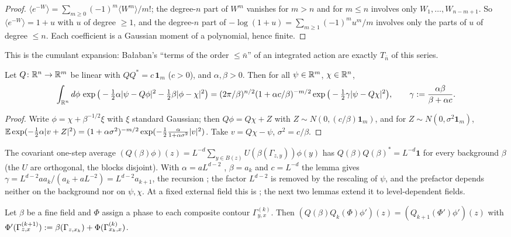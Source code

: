 \begin{proof}
$\langle e^{-W}\rangle=\sum_{m\ge0}(-1)^m\langle W^m\rangle/m!$; the degree-$n$ part of $W^m$ vanishes for $m>n$ and for $m\le n$ involves only $W_1,\dots,W_{n-m+1}$. So $\langle e^{-W}\rangle=1+u$ with $u$ of degree $\ge1$, and the degree-$n$ part of $-\log(1+u)=\sum_{m\ge1}(-1)^mu^m/m$ involves only the parts of $u$ of degree $\le n$. Each coefficient is a Gaussian moment of a polynomial, hence finite.
\end{proof}

This is the cumulant expansion: Ba{\l}aban's ``terms of the order $\le\bar n$'' of an integrated action are exactly $T_{\bar n}$ of this series.

\begin{lemma}\label{lem:a06d:B3}
Let $Q\colon\mathbb R^n\to\mathbb R^m$ be linear with $QQ^*=c\,\mathbf 1_m$ ($c>0$), and $\alpha,\beta>0$. Then for all $\psi\in\mathbb R^m$, $\chi\in\mathbb R^n$,
\[
\int_{\mathbb R^n}d\phi\,\exp\big(-\tfrac12\alpha|\psi-Q\phi|^2-\tfrac12\beta|\phi-\chi|^2\big)=(2\pi/\beta)^{n/2}(1+\alpha c/\beta)^{-m/2}\exp\big(-\tfrac12\gamma|\psi-Q\chi|^2\big),\qquad\gamma:=\frac{\alpha\beta}{\beta+\alpha c}.
\]
\end{lemma}

\begin{proof}
Write $\phi=\chi+\beta^{-1/2}\xi$ with $\xi$ standard Gaussian; then $Q\phi=Q\chi+Z$ with $Z\sim N(0,(c/\beta)\mathbf 1_m)$, and for $Z\sim N(0,\sigma^2\mathbf 1_m)$, $\mathbb E\exp(-\frac12\alpha|v+Z|^2)=(1+\alpha\sigma^2)^{-m/2}\exp(-\frac12\frac{\alpha}{1+\alpha\sigma^2}|v|^2)$. Take $v=Q\chi-\psi$, $\sigma^2=c/\beta$.
\end{proof}

The covariant one-step average $(Q(\beta)\phi)(z)=L^{-d}\sum_{y\in B(z)}U(\beta(\Gamma_{z,y}))\phi(y)$ has $Q(\beta)Q(\beta)^*=L^{-d}\mathbf 1$ for every background $\beta$ (the $U$ are orthogonal, the blocks disjoint). With $\alpha=aL^{d-2}$ \cite[(3.38)]{Ba1}, $\beta=a_k$ and $c=L^{-d}$ the lemma gives $\gamma=L^{d-2}aa_k/(a_k+aL^{-2})=L^{d-2}a_{k+1}$, the recursion \cite[(2.13)]{Ba1}; the factor $L^{d-2}$ is removed by the rescaling of $\psi$, and the prefactor depends neither on the background nor on $\psi,\chi$. At a fixed external field this is \cite[(2.10)--(2.16)]{Ba1}; the next two lemmas extend it to level-dependent fields.

\begin{lemma}\label{lem:a06d:B4}
Let $\beta$ be a fine field and $\Phi$ assign a phase to each composite contour $\Gamma^{(k)}_{y,x}$. Then $(Q(\beta)Q_k(\Phi)\phi')(z)=(Q_{k+1}(\Phi')\phi')(z)$ with $\Phi'(\Gamma^{(k+1)}_{z,x}):=\beta(\Gamma_{z,x_k})+\Phi(\Gamma^{(k)}_{x_k,x})$.
\end{lemma}

